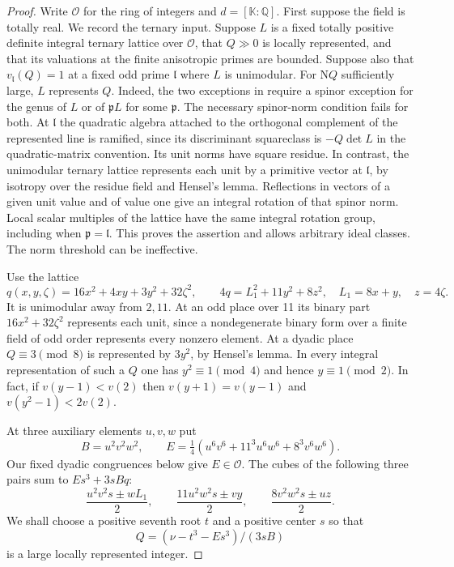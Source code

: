\documentclass[11pt,letterpaper]{article}
\theoremstyle{definition}
\numberwithin{equation}{section}
\begin{document}
\begin{proof}
Write $\mathcal O$ for the ring of integers and $d=[\mathbb K:\mathbb Q]$.
First suppose the field is totally real. We record the ternary input. Suppose $L$ is a fixed totally
positive definite integral ternary lattice over $\mathcal O$, that
$Q\gg0$ is locally represented, and that its valuations at the finite
anisotropic primes are bounded. Suppose also that
$v_{\mathfrak l}(Q)=1$ at a fixed odd prime $\mathfrak l$ where $L$
is unimodular. For $\mathrm NQ$ sufficiently large, $L$ represents
$Q$. Indeed, the two exceptions in
\cite[Corollary~5.6]{nf3:schulzesurvey} require a spinor exception
for the genus of $L$ or of $\mathfrak pL$ for some $\mathfrak p$.
The necessary spinor-norm condition
\cite[Theorem~1]{nf3:schulzespin} fails for both. At
$\mathfrak l$ the quadratic algebra attached to the orthogonal
complement of the represented line is ramified, since its
discriminant squareclass is $-Q\det L$ in the quadratic-matrix
convention. Its unit norms have square residue. In contrast, the
unimodular ternary lattice represents each unit by a primitive vector
at $\mathfrak l$, by isotropy over the residue field and Hensel's
lemma. Reflections in vectors of a given unit value and of value one
give an integral rotation of that spinor norm. Local scalar multiples
of the lattice have the same integral rotation group, including when
$\mathfrak p=\mathfrak l$. This proves the assertion and allows
arbitrary ideal classes. The norm threshold can be ineffective.

Use the lattice
\[
 q(x,y,\zeta)=16x^2+4xy+3y^2+32\zeta^2,\qquad
 4q=L_1^2+11y^2+8z^2,\quad L_1=8x+y,\quad z=4\zeta.
\]
It is unimodular away from $2,11$. At an odd place over 11 its
binary part $16x^2+32\zeta^2$ represents each unit, since a
nondegenerate binary form over a finite field of odd order
represents every nonzero element. At a dyadic place $Q\equiv3\pmod8$
is represented by $3y^2$, by Hensel's lemma. In every integral
representation of such a $Q$ one has $y^2\equiv1\pmod4$ and hence
$y\equiv1\pmod2$. In fact, if $v(y-1)<v(2)$ then
$v(y+1)=v(y-1)$ and $v(y^2-1)<2v(2)$.

At three auxiliary elements $u,v,w$ put
\[
 B=u^2v^2w^2,\qquad
 E=\tfrac14(u^6v^6+11^3u^6w^6+8^3v^6w^6).
\]
Our fixed dyadic congruences below give $E\in\mathcal O$. The
cubes of the following three pairs sum to $Es^3+3sBq$:
\begin{equation}\label{nf3:pairidentity}
 \frac{u^2v^2s\pm wL_1}{2},\qquad
 \frac{11u^2w^2s\pm vy}{2},\qquad
 \frac{8v^2w^2s\pm uz}{2}.
\end{equation}
We shall choose a positive seventh root $t$ and a positive center
$s$ so that
\begin{equation}\label{nf3:seventarget}
 Q=(\nu-t^3-Es^3)/(3sB)
\end{equation}
is a large locally represented integer.


\end{proof}
\end{document}
